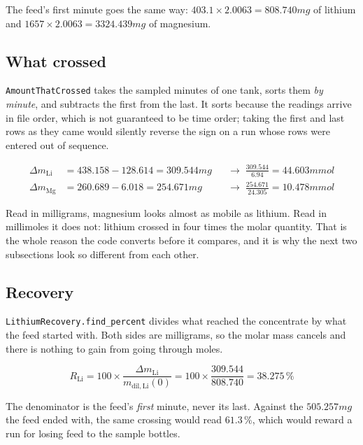 The feed's first minute goes the same way: $403.1 \times 2.0063 = 808.740\unit{mg}$ of
lithium and $1657 \times 2.0063 = 3324.439\unit{mg}$ of magnesium.

\subsection{What crossed}

\texttt{AmountThatCrossed} takes the sampled minutes of one tank, sorts them \emph{by
minute}, and subtracts the first from the last. It sorts because the readings arrive in file
order, which is not guaranteed to be time order; taking the first and last rows as they came
would silently reverse the sign on a run whose rows were entered out of sequence.

\begin{align}
\Delta m_{\mathrm{Li}} &= 438.158 - 128.614 = 309.544\unit{mg}
   &&\rightarrow\; \frac{309.544}{6.94} = 44.603\unit{mmol} \label{eq:crossed-li} \\
\Delta m_{\mathrm{Mg}} &= 260.689 -   6.018 = 254.671\unit{mg}
   &&\rightarrow\; \frac{254.671}{24.305} = 10.478\unit{mmol} \label{eq:crossed-mg}
\end{align}

Read in milligrams, magnesium looks almost as mobile as lithium. Read in millimoles it does
not: lithium crossed in four times the molar quantity. That is the whole reason the code
converts before it compares, and it is why the next two subsections look so different from
each other.

\subsection{Recovery}

\texttt{LithiumRecovery.find\_percent} divides what reached the concentrate by what the feed
started with. Both sides are milligrams, so the molar mass cancels and there is nothing to
gain from going through moles.

\begin{equation}\label{eq:recovery-ae}
R_{\mathrm{Li}} = 100 \times \frac{\Delta m_{\mathrm{Li}}}{m_{\mathrm{dil,Li}}(0)}
                = 100 \times \frac{309.544}{808.740} = 38.275\,\%
\end{equation}

The denominator is the feed's \emph{first} minute, never its last. Against the
$505.257\unit{mg}$ the feed ended with, the same crossing would read $61.3\,\%$, which would
reward a run for losing feed to the sample bottles.

